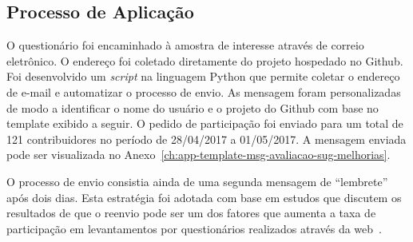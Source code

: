 \subsection{Processo de Aplicação}
\label{ssub:processo_de_aplicação}

O questionário foi encaminhado à amostra de interesse através de correio
eletrônico. O endereço foi coletado diretamente do projeto hospedado no Github.
Foi desenvolvido um \textit{script} na linguagem Python que permite coletar o
endereço de e-mail e automatizar o processo de envio. As mensagem foram
personalizadas de modo a identificar o nome do usuário e o projeto do Github
com base no template exibido a seguir. O pedido de participação foi enviado
para um total de 121 contribuidores no período de 28/04/2017 a 01/05/2017. A
mensagem enviada pode ser visualizada no
Anexo~\ref{ch:app-template-msg-avaliacao-sug-melhorias}.







O processo de envio consistia ainda de uma segunda mensagem de ``lembrete'' após
dois dias. Esta estratégia foi adotada com base em estudos que discutem os
resultados de que o reenvio pode ser um dos fatores que aumenta a taxa de
participação em levantamentos por questionários realizados através da
web~\cite{fan2010factors}.

